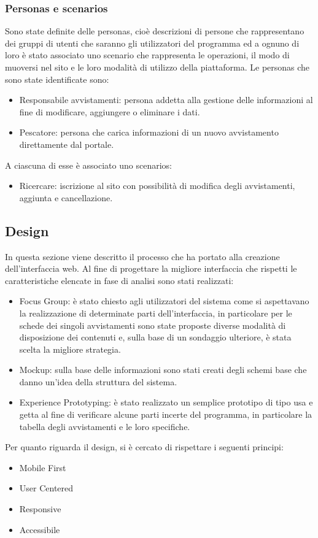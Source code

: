 \documentclass[a4paper,final,12pt]{report}
\begin{document}
\subsubsection{Personas e scenarios}
Sono state definite delle personas, cioè descrizioni di persone che rappresentano dei gruppi di utenti che saranno gli utilizzatori del programma ed a ognuno di loro è stato associato uno scenario che rappresenta le operazioni, il modo di muoversi nel sito e le loro modalità di utilizzo della piattaforma.
Le personas che sono state identificate sono:
\begin{itemize}
 \item Responsabile avvistamenti: persona addetta alla gestione delle informazioni al fine di modificare, aggiungere o eliminare i dati. 
\item Pescatore: persona che carica informazioni di un nuovo avvistamento direttamente dal portale.
 \end{itemize} 
 A ciascuna di esse è associato uno scenarios:
 \begin{itemize}
 \item Ricercare: iscrizione al sito con possibilità di modifica degli avvistamenti, aggiunta e cancellazione.
 \end{itemize}

\subsection{Design}
In questa sezione viene descritto il processo che ha portato alla creazione dell'interfaccia web.
Al fine di progettare la migliore interfaccia che rispetti le caratteristiche elencate in fase di analisi sono stati realizzati:
\begin{itemize}
\item Focus Group: è stato chiesto agli utilizzatori del sistema come si aspettavano la realizzazione di determinate parti dell'interfaccia, in particolare per le schede dei singoli avvistamenti sono state proposte diverse modalità di disposizione dei contenuti e, sulla base di un sondaggio ulteriore, è stata scelta la migliore strategia.
\item Mockup: sulla base delle informazioni sono stati creati degli schemi base che danno un'idea della struttura del sistema.
\item Experience Prototyping: è stato realizzato un semplice prototipo di tipo usa e getta al fine di verificare alcune parti incerte del programma, in particolare la tabella degli avvistamenti e le loro specifiche.
\end{itemize}
Per quanto riguarda il design, si è cercato di rispettare i seguenti principi:
\begin{itemize}
\item Mobile First
\item User Centered
\item Responsive
\item Accessibile
\end{itemize}
\end{document}
